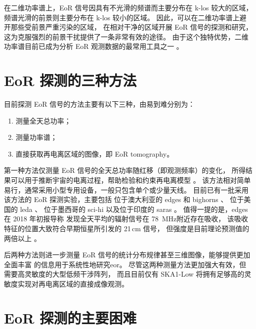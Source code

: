 在二维功率谱上，EoR 信号因具有不光滑的频谱而主要分布在 \ac{k-los} 较大的区域，
频谱光滑的前景则主要分布在 \ac{k-los} 较小的区域。
因此，可以在二维功率谱上避开那些受前景严重污染的区域，
在相对干净的区域开展 EoR 信号的探测和研究，
这为克服强烈的前景干扰提供了一条非常有效的途径。
由于这个独特优势，二维功率谱目前已成为分析 EoR 观测数据的最常用工具之一
\cite{trott2012,thyagarajan2013,barry2016,beardsley2016,trott2016,patil2017}。


\section{EoR 探测的三种方法}
\label{sec:det-methods}

目前探测 EoR 信号的方法主要有以下三种，由易到难分别为：
\begin{enumerate}
  \item 测量全天总功率；
  \item 测量功率谱；
  \item 直接获取再电离区域的图像，即 EoR \ac{tomography}。
\end{enumerate}

第一种方法仅测量 EoR 信号的全天总功率随红移（即观测频率）的变化，
所得结果可以用于推断宇宙的电离过程，帮助检验和约束再电离模型
\cite{pritchard2012,liu2016}。
该方法相对简单易行，通常采用小型专用设备，一般只包含单个或少量天线。
目前已有一批采用该方法的 EoR 探测实验，主要包括
位于澳大利亚的 \ac{edges} \cite{bowman2008} 和
\ac{bighorns} \cite{sokolowski2015}、
位于美国的 \ac{leda} \cite{greenhill2012}、
位于墨西哥的 \ac{sci-hi} \cite{voytek2014}
以及位于印度的 \ac{saras} \cite{singh2018}。
值得一提的是，\acs{edges} 在 2018 年初报导称
发现全天平均的辐射信号在 \SI{78}{\MHz}附近存在吸收，
该吸收特征的位置大致符合早期恒星所引发的 21\,cm 信号，
但强度是目前理论预测值的两倍以上 \cite{bowman2018}。

后两种方法则进一步测量 EoR 信号的统计分布规律甚至三维图像，能够提供更加全面丰富
的信息用于系统性地研究\acl{eor}。
尽管这两种测量方法更加强大有效，但需要高灵敏度的大型低频干涉阵列，
而且目前仅有 SKA1-Low 将拥有足够高的灵敏度实现对再电离区域的直接成像观测。


\section{EoR 探测的主要困难}
\label{sec:det-difficulties}


